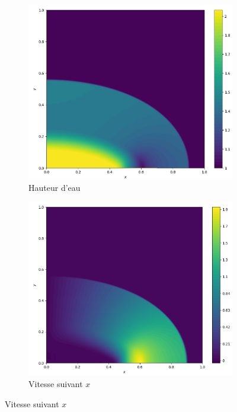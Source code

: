 \documentclass[
	french,
	11pt, %
]{fphw}
\begin{document}
\begin{figure}[H]
	\centering
	\begin{subfigure}{0.32\textwidth}
		\centering
		\includegraphics[width=\textwidth,height=0.85\textwidth]{Riem4h.png}
		\caption{Hauteur d'eau}
		\label{fig:Riem4h}
	\end{subfigure}
	\begin{subfigure}{0.32\textwidth}
		\centering
		\includegraphics[width=\textwidth,height=0.85\textwidth]{Riem4u.png}
		\caption{Vitesse suivant $x$}

\end{subfigure}
\end{figure}
\end{document}
